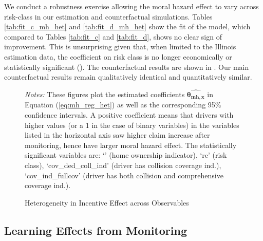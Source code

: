 We conduct a robustness exercise allowing the moral hazard effect to vary across risk-class in our estimation and counterfactual simulations. Tables \ref{tab:fit_c_mh_het} and \ref{tab:fit_d_mh_het} show the fit of the model, which compared to Tables \ref{tab:fit_c} and \ref{tab:fit_d}, shows no clear sign of improvement. This is unsurprising given that, when limited to the Illinois estimation data, the coefficient on risk class is no longer economically or statistically significant (). The counterfactual results are shown in . Our main counterfactual results remain qualitatively identical and quantitatively similar.

\begin{figure}[H]
\centering
{}
\caption{Heterogeneity in Incentive Effect across Coverage Choice \label{fig:mh_reg_het_X}}
\vspace{0.5cm}
\caption{Heterogeneity in Incentive Effect across Observables \label{fig:mh_reg_het_y}}
\vspace{0.25cm}
\begin{minipage}{0.9\textwidth}
{\footnotesize \emph{Notes:} These figures plot the estimated coefficients $\hat{\mathbf{\theta_{mh,x}}}$ in Equation (\ref{eq:mh_reg_het}) as well as the corresponding 95\% confidence intervals. A positive coefficient means that drivers with higher values (or a 1 in the case of binary variables) in the variables listed in the horizontal axis saw higher claim increase after monitoring, hence have larger moral hazard effect. The statistically significant variables are: `' (home ownership indicator), `rc' (risk class), `cov\_ded\_coll\_ind' (driver has collision coverage ind.), `cov\_ind\_fullcov' (driver has both collision and comprehensive coverage ind.). \par}
\end{minipage}
\end{figure}


\pagebreak
\subsection{Learning Effects from Monitoring}\label{subsec:app-learning}

